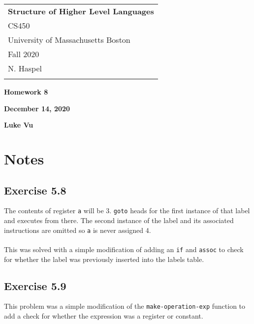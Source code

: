 \documentclass[a4paper,12pt]{article}
\begin{document}
	\thispagestyle{empty}

	\begin{tabular}{p{15.5cm}}
		{\large \bf Structure of Higher Level Languages} \\ CS450 \\
		University of Massachusetts Boston \\ Fall 2020  \\ N. Haspel\\
		\hline
		\\
	\end{tabular}

	\vspace*{0.1cm}

	\begin{center}
		{\Large \bf Homework 8}
		\vspace{1mm}

		{\bf December 14, 2020}
		\vspace{1mm}

		{\bf Luke Vu}
	\end{center}

	\vspace*{0.5cm}

\section{Notes}


\subsection{Exercise 5.8}
The contents of register \texttt{a} will be 3. \texttt{goto} heads for the first instance of that label and executes from there. The second instance of the label and its associated instructions are omitted so \texttt{a} is never assigned 4.\\
\\
This was solved with a simple modification of adding an \texttt{if} and \texttt{assoc} to check for whether the label was previously inserted into the labels table.


\subsection{Exercise 5.9}
This problem was a simple modification of the \texttt{make-operation-exp} function to add a check for whether the expression was a register or constant.
\end{document}
